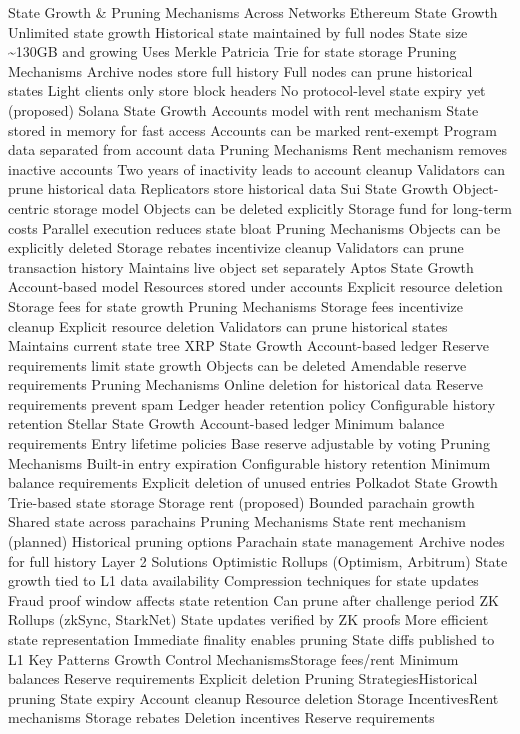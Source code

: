 \documentclass[
  letterpaper,
  DIV=11,
  numbers=noendperiod]{scrreprt}
\begin{document}
State Growth \& Pruning Mechanisms Across Networks Ethereum State Growth
Unlimited state growth Historical state maintained by full nodes State
size \textasciitilde130GB and growing Uses Merkle Patricia Trie for
state storage Pruning Mechanisms Archive nodes store full history Full
nodes can prune historical states Light clients only store block headers
No protocol-level state expiry yet (proposed) Solana State Growth
Accounts model with rent mechanism State stored in memory for fast
access Accounts can be marked rent-exempt Program data separated from
account data Pruning Mechanisms Rent mechanism removes inactive accounts
Two years of inactivity leads to account cleanup Validators can prune
historical data Replicators store historical data Sui State Growth
Object-centric storage model Objects can be deleted explicitly Storage
fund for long-term costs Parallel execution reduces state bloat Pruning
Mechanisms Objects can be explicitly deleted Storage rebates incentivize
cleanup Validators can prune transaction history Maintains live object
set separately Aptos State Growth Account-based model Resources stored
under accounts Explicit resource deletion Storage fees for state growth
Pruning Mechanisms Storage fees incentivize cleanup Explicit resource
deletion Validators can prune historical states Maintains current state
tree XRP State Growth Account-based ledger Reserve requirements limit
state growth Objects can be deleted Amendable reserve requirements
Pruning Mechanisms Online deletion for historical data Reserve
requirements prevent spam Ledger header retention policy Configurable
history retention Stellar State Growth Account-based ledger Minimum
balance requirements Entry lifetime policies Base reserve adjustable by
voting Pruning Mechanisms Built-in entry expiration Configurable history
retention Minimum balance requirements Explicit deletion of unused
entries Polkadot State Growth Trie-based state storage Storage rent
(proposed) Bounded parachain growth Shared state across parachains
Pruning Mechanisms State rent mechanism (planned) Historical pruning
options Parachain state management Archive nodes for full history Layer
2 Solutions Optimistic Rollups (Optimism, Arbitrum) State growth tied to
L1 data availability Compression techniques for state updates Fraud
proof window affects state retention Can prune after challenge period ZK
Rollups (zkSync, StarkNet) State updates verified by ZK proofs More
efficient state representation Immediate finality enables pruning State
diffs published to L1 Key Patterns Growth Control MechanismsStorage
fees/rent Minimum balances Reserve requirements Explicit deletion
Pruning StrategiesHistorical pruning State expiry Account cleanup
Resource deletion Storage IncentivesRent mechanisms Storage rebates
Deletion incentives Reserve requirements
\end{document}
